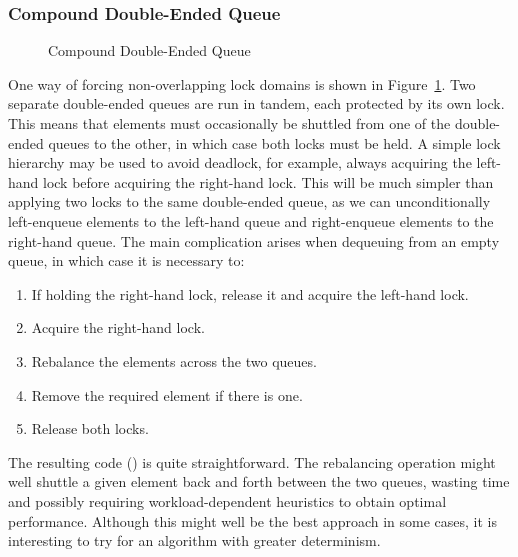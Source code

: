\subsubsection{Compound Double-Ended Queue}
\label{sec:SMPdesign:Compound Double-Ended Queue}

\begin{figure}[tb]
\centering
{}
\caption{Compound Double-Ended Queue}
\label{fig:SMPdesign:Compound Double-Ended Queue}
\end{figure}

One way of forcing non-overlapping lock domains is shown in
Figure~\ref{fig:SMPdesign:Compound Double-Ended Queue}.
Two separate double-ended queues are run in tandem, each protected by
its own lock.
This means that elements must occasionally be shuttled from one of
the double-ended queues to the other, in which case both locks must
be held.
A simple lock hierarchy may be used to avoid deadlock, for example,
always acquiring the left-hand lock before acquiring the right-hand lock.
This will be much simpler than applying two locks to the same
double-ended queue, as we can unconditionally left-enqueue elements
to the left-hand queue and right-enqueue elements to the right-hand
queue.
The main complication arises when dequeuing from an empty queue, in
which case it is necessary to:

\begin{enumerate}
\item	If holding the right-hand lock, release it and acquire the
	left-hand lock.
\item	Acquire the right-hand lock.
\item	Rebalance the elements across the two queues.
\item	Remove the required element if there is one.
\item	Release both locks.
\end{enumerate}

\QuickQuizEnd

The resulting code () is quite straightforward.
The rebalancing operation might well shuttle a given element back
and forth between the two queues, wasting time and possibly requiring
workload-dependent heuristics to obtain optimal performance.
Although this might well be the best approach in some cases, it is
interesting to try for an algorithm with greater determinism.

